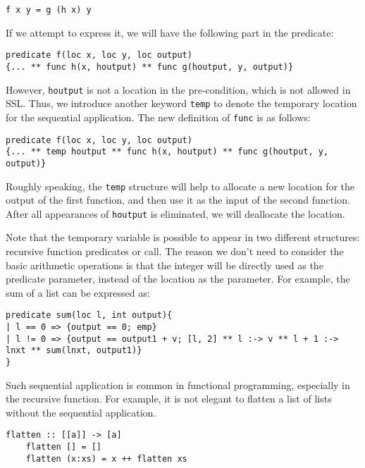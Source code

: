 \begin{lstlisting}[language=SynLang]
f x y = g (h x) y
\end{lstlisting}

If we attempt to express it, we will have the following part in the predicate:

\begin{lstlisting}[language=SynLang]
predicate f(loc x, loc y, loc output)
{... ** func h(x, houtput) ** func g(houtput, y, output)}
\end{lstlisting}

However, \lstinline{houtput} is not a location in the pre-condition, which is not allowed in SSL. Thus, we introduce another keyword \lstinline{temp} to denote the temporary location for the sequential application. The new definition of \lstinline{func} is as follows:

\begin{lstlisting}[language=SynLang]
predicate f(loc x, loc y, loc output)
{... ** temp houtput ** func h(x, houtput) ** func g(houtput, y, output)}
\end{lstlisting}

Roughly speaking, the \lstinline{temp} structure will help to allocate a new location for the output of the first function, and then use it as the input of the second function. After all appearances of \lstinline{houtput} is eliminated, we will deallocate the location.

Note that the temporary variable is possible to appear in two different structures: recursive function predicates or \func call. The reason we don't need to consider the basic arithmetic operations is that the integer will be directly used as the predicate parameter, instead of the location as the parameter. For example, the sum of a list can be expressed as:

\begin{lstlisting}[language=SynLang]
predicate sum(loc l, int output){
| l == 0 => {output == 0; emp}
| l != 0 => {output == output1 + v; [l, 2] ** l :-> v ** l + 1 :-> lnxt ** sum(lnxt, output1)}
}
\end{lstlisting}

Such sequential application is common in functional programming, especially in the recursive function. For example, it is not elegant to flatten a list of lists without the sequential application. 

\begin{lstlisting}[language=Pika]
    flatten :: [[a]] -> [a]
    flatten [] = []
    flatten (x:xs) = x ++ flatten xs
\end{lstlisting}

